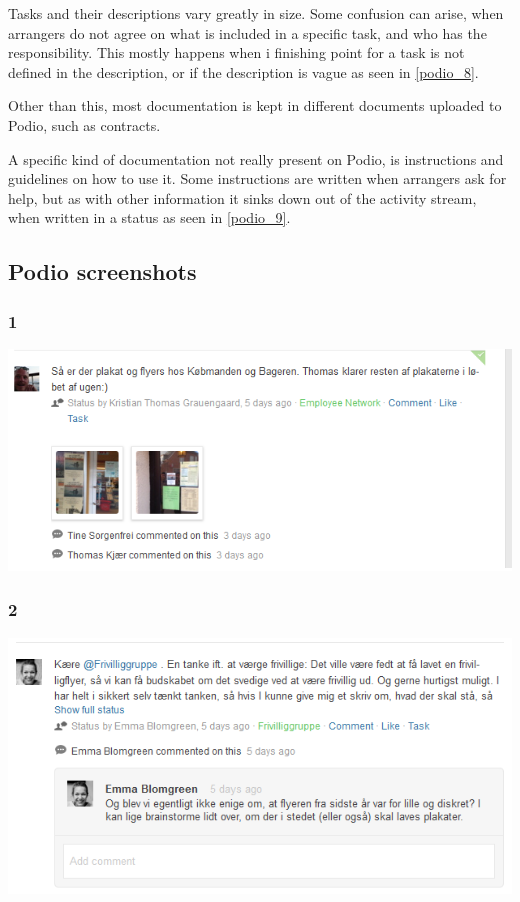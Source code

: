 Tasks and their descriptions vary greatly in size. Some confusion can arise, when arrangers do not agree on what is included in a specific task, and who has the responsibility. This mostly happens when i finishing point for a task is not defined in the description, or if the description is vague as seen in \ref{podio_8}.

Other than this, most documentation is kept in  different documents uploaded to Podio, such as contracts.

A specific kind of documentation not really present on Podio, is instructions and guidelines on how to use it. Some instructions are written when arrangers ask for help, but as with other information it sinks down out of the activity stream, when written in a status as seen in \ref{podio_9}. 

\subsection{Podio screenshots}
\label{podio_screens}

\subsubsection{1}
\label{podio_1}
\includegraphics[scale=0.7]{Pictures/Podio_1.png}

\subsubsection{2}
\label{podio_2}
\includegraphics[scale=0.7]{Pictures/Podio_2.png}

